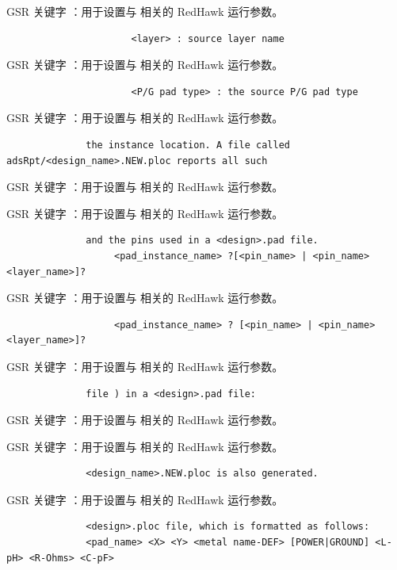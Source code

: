 GSR 关键字 ：用于设置与  相关的 RedHawk 运行参数。

\begin{lstlisting}
                      <layer> : source layer name
\end{lstlisting}

GSR 关键字 ：用于设置与  相关的 RedHawk 运行参数。

\begin{lstlisting}
                      <P/G pad type> : the source P/G pad type
\end{lstlisting}

GSR 关键字 ：用于设置与  相关的 RedHawk 运行参数。

\begin{lstlisting}
              the instance location. A file called adsRpt/<design_name>.NEW.ploc reports all such
\end{lstlisting}

GSR 关键字 ：用于设置与  相关的 RedHawk 运行参数。

GSR 关键字 ：用于设置与  相关的 RedHawk 运行参数。

\begin{lstlisting}
              and the pins used in a <design>.pad file.
                   <pad_instance_name> ?[<pin_name> | <pin_name> <layer_name>]?
\end{lstlisting}

GSR 关键字 ：用于设置与  相关的 RedHawk 运行参数。

\begin{lstlisting}
                   <pad_instance_name> ? [<pin_name> | <pin_name> <layer_name>]?
\end{lstlisting}

GSR 关键字 ：用于设置与  相关的 RedHawk 运行参数。

\begin{lstlisting}
              file ) in a <design>.pad file:
\end{lstlisting}

GSR 关键字 ：用于设置与  相关的 RedHawk 运行参数。

GSR 关键字 ：用于设置与  相关的 RedHawk 运行参数。

\begin{lstlisting}
              <design_name>.NEW.ploc is also generated.
\end{lstlisting}

GSR 关键字 ：用于设置与  相关的 RedHawk 运行参数。

\begin{lstlisting}
              <design>.ploc file, which is formatted as follows:
              <pad_name> <X> <Y> <metal name-DEF> [POWER|GROUND] <L-pH> <R-Ohms> <C-pF>
\end{lstlisting}

